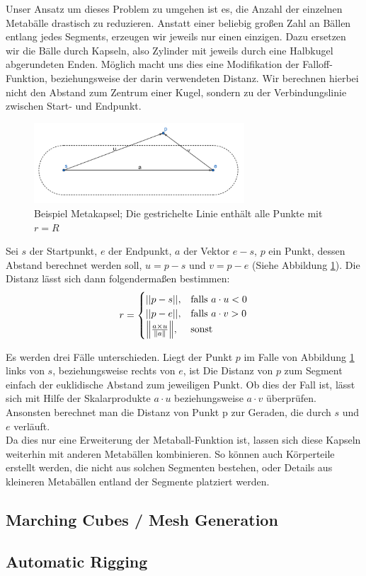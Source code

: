 Unser Ansatz um dieses Problem zu umgehen ist es, die Anzahl der einzelnen Metabälle drastisch zu reduzieren. Anstatt einer beliebig großen Zahl an Bällen entlang jedes Segments, erzeugen wir jeweils nur einen einzigen. Dazu ersetzen wir die Bälle durch Kapseln, also Zylinder mit jeweils durch eine Halbkugel abgerundeten Enden. Möglich macht uns dies eine Modifikation der Falloff-Funktion, beziehungsweise der darin verwendeten Distanz. Wir berechnen hierbei nicht den Abstand zum Zentrum einer Kugel, sondern zu der Verbindungslinie zwischen Start- und Endpunkt. \\

\begin{figure}[ht]
\centering
\includegraphics[width=0.7\textwidth]{resources/img/metacapsule.png}
\caption{Beispiel Metakapsel; Die gestrichelte Linie enthält alle Punkte mit $r=R$}
\label{metacapsule}
\end{figure}

Sei $s$ der Startpunkt, $e$ der Endpunkt, $a$ der Vektor $e-s$, $p$ ein Punkt, dessen Abstand berechnet werden soll, $u=p-s$ und $v=p-e$ (Siehe Abbildung \ref{metacapsule}). Die Distanz lässt sich dann folgendermaßen bestimmen:
\[
    r= 
\begin{cases}
    ||p-s||,& \text{falls } a\cdot u < 0\\
    ||p-e||,& \text{falls } a\cdot v > 0\\
    \norm*{\frac{a\times u}{\norm{a}}},& \text{sonst}
\end{cases}
\]

Es werden drei Fälle unterschieden. Liegt der Punkt $p$ im Falle von Abbildung \ref{metacapsule} links von $s$, beziehungsweise rechts von $e$, ist Die Distanz von $p$ zum Segment einfach der euklidische Abstand zum jeweiligen Punkt. Ob dies der Fall ist, lässt sich mit Hilfe der Skalarprodukte $a\cdot u$ beziehungsweise $a\cdot v$ überprüfen. Ansonsten berechnet man die Distanz von Punkt p zur Geraden, die durch $s$ und $e$ verläuft.\\

Da dies nur eine Erweiterung der Metaball-Funktion ist, lassen sich diese Kapseln weiterhin mit anderen Metabällen kombinieren. So können auch Körperteile erstellt werden, die nicht aus solchen Segmenten bestehen, oder Details aus kleineren Metabällen entland der Segmente platziert werden.



\subsection{Marching Cubes / Mesh Generation}



\subsection{Automatic Rigging}